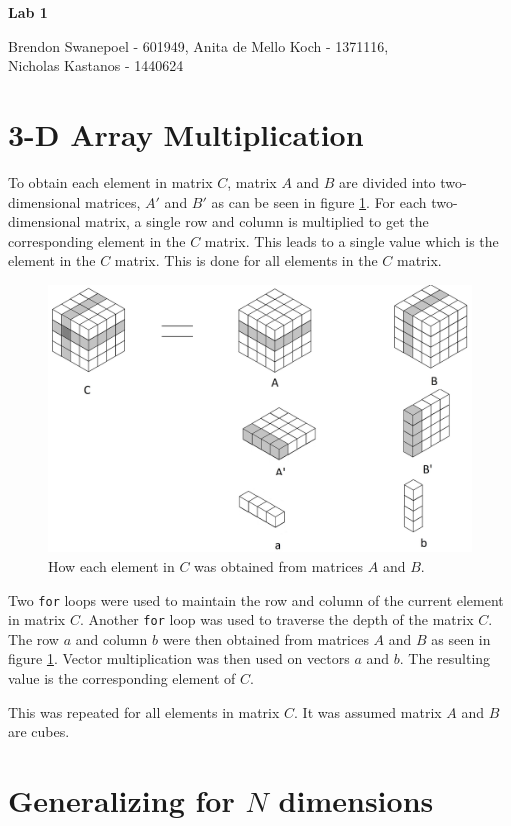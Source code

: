 \documentclass[a4paper,10pt]{article}
\begin{document}
{\LARGE{\centerline{\bf Lab 1}}}
\Large{Brendon Swanepoel - 601949, Anita de Mello Koch - 1371116, \\ Nicholas Kastanos - 1440624}

\section{3-D Array Multiplication}

To obtain each element in matrix $C$, matrix $A$ and $B$ are divided into two-dimensional matrices, $A'$ and $B'$ as can be seen in figure \ref{3DMult}.
For each two-dimensional matrix, a single row and column is multiplied to get the corresponding element in the $C$ matrix.
This leads to a single value which is the element in the $C$ matrix.
This is done for all elements in the $C$ matrix.

\begin{figure}[h]
\centering
\includegraphics[scale=0.15]{3D.jpg}
\caption{How each element in $C$ was obtained from matrices $A$ and $B$.}\label{3DMult}
\end{figure}

Two \texttt{for} loops were used to maintain the row and column of the current element in matrix $C$.
Another \texttt{for} loop was used to traverse the depth of the matrix $C$.
The row $a$ and column $b$ were then obtained from matrices $A$ and $B$ as seen in figure \ref{3DMult}.
Vector multiplication was then used on vectors $a$ and $b$.
The resulting value is the corresponding element of $C$.

This was repeated for all elements in matrix $C$.
It was assumed matrix $A$ and $B$ are cubes.

\section{Generalizing for $N$ dimensions}
\end{document}
